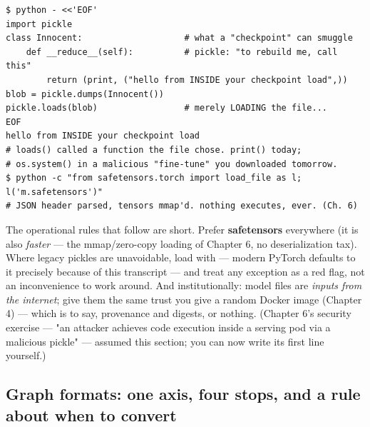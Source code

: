 \begin{terminalbox}
\begin{Verbatim}[breaklines=true,breakanywhere=true,fontsize=\small,formatcom=\color{tbbtermfg},codes=\tbbcodeactive]
$ python - <<'EOF'
import pickle
class Innocent:                    # what a "checkpoint" can smuggle
    def __reduce__(self):          # pickle: "to rebuild me, call this"
        return (print, ("hello from INSIDE your checkpoint load",))
blob = pickle.dumps(Innocent())
pickle.loads(blob)                 # merely LOADING the file...
EOF
hello from INSIDE your checkpoint load
# loads() called a function the file chose. print() today;
# os.system() in a malicious "fine-tune" you downloaded tomorrow.
$ python -c "from safetensors.torch import load_file as l; l('m.safetensors')"
# JSON header parsed, tensors mmap'd. nothing executes, ever. (Ch. 6)
\end{Verbatim}
\end{terminalbox}

The operational rules that follow are short. Prefer \textbf{safetensors} everywhere (it is also \textit{faster} — the mmap/zero-copy loading of Chapter 6, no deserialization tax). Where legacy pickles are unavoidable, load with  — modern PyTorch defaults to it precisely because of this transcript — and treat any exception as a red flag, not an inconvenience to work around. And institutionally: model files are \textit{inputs from the internet}; give them the same trust you give a random Docker image (Chapter 4) — which is to say, provenance and digests, or nothing. (Chapter 6's security exercise — "an attacker achieves code execution inside a serving pod via a malicious pickle" — assumed this section; you can now write its first line yourself.)

\subsection*{Graph formats: one axis, four stops, and a rule about when to convert}

